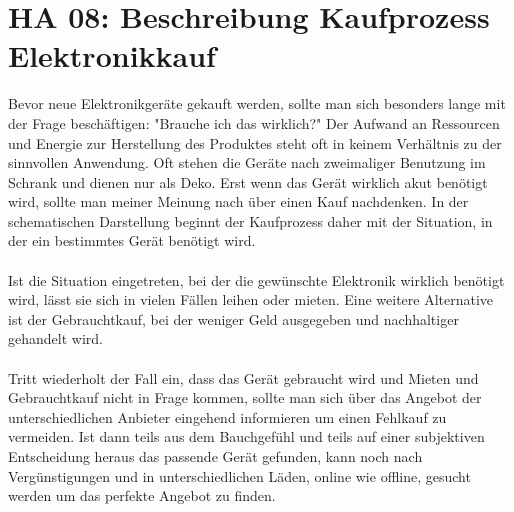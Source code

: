 \section{HA 08: Beschreibung Kaufprozess Elektronikkauf}
  Bevor neue Elektronikgeräte gekauft werden, sollte man sich besonders lange mit der Frage beschäftigen: "Brauche ich das wirklich?" Der Aufwand an Ressourcen und Energie zur Herstellung des Produktes steht oft in keinem Verhältnis zu der sinnvollen Anwendung. Oft stehen die Geräte nach zweimaliger Benutzung im Schrank und dienen nur als Deko. Erst wenn das Gerät wirklich akut benötigt wird, sollte man meiner Meinung nach über einen Kauf nachdenken. In der schematischen Darstellung beginnt der Kaufprozess daher mit der Situation, in der ein bestimmtes Gerät benötigt wird.\\\\
  Ist die Situation eingetreten, bei der die gewünschte Elektronik wirklich benötigt wird, lässt sie sich in vielen Fällen leihen oder mieten. Eine weitere Alternative ist der Gebrauchtkauf, bei der weniger Geld ausgegeben und nachhaltiger gehandelt wird.\\\\
  Tritt wiederholt der Fall ein, dass das Gerät gebraucht wird und Mieten und Gebrauchtkauf nicht in Frage kommen, sollte man sich über das Angebot der unterschiedlichen Anbieter eingehend informieren um einen Fehlkauf zu vermeiden. Ist dann teils aus dem Bauchgefühl und teils auf einer subjektiven Entscheidung heraus das passende Gerät gefunden, kann noch nach Vergünstigungen und in unterschiedlichen Läden, online wie offline, gesucht werden um das perfekte Angebot zu finden.\\
